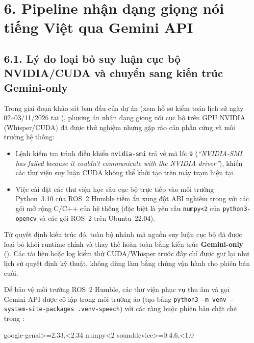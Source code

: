 \section*{6. Pipeline nhận dạng giọng nói tiếng Việt qua Gemini API}

\subsection*{6.1. Lý do loại bỏ suy luận cục bộ NVIDIA/CUDA và chuyển sang kiến trúc Gemini-only}

Trong giai đoạn khảo sát ban đầu của dự án (xem hồ sơ kiểm toán lịch sử ngày 02--03/11/2026 tại ), phương án nhận dạng giọng nói cục bộ trên GPU NVIDIA (Whisper/CUDA) đã được thử nghiệm nhưng gặp rào cản phần cứng và môi trường hệ thống:
\begin{itemize}[leftmargin=1.2cm]
  \item Lệnh kiểm tra trình điều khiển \texttt{nvidia-smi} trả về mã lỗi \texttt{9} (\textit{``NVIDIA-SMI has failed because it couldn't communicate with the NVIDIA driver''}), khiến các thư viện suy luận CUDA không thể khởi tạo trên máy trạm hiện tại.
  \item Việc cài đặt các thư viện học sâu cục bộ trực tiếp vào môi trường Python~3.10 của ROS~2 Humble tiềm ẩn xung đột ABI nghiêm trọng với các gói mở rộng C/C++ của hệ thống (đặc biệt là yêu cầu \texttt{numpy<2} của \texttt{python3-opencv} và các gói ROS~2 trên Ubuntu~22.04).
\end{itemize}

Từ quyết định kiến trúc đó, toàn bộ nhánh mã nguồn suy luận cục bộ đã được loại bỏ khỏi runtime chính và thay thế hoàn toàn bằng kiến trúc \textbf{Gemini-only} (). Các tài liệu hoặc log kiểm thử CUDA/Whisper trước đây chỉ được giữ lại như lịch sử quyết định kỹ thuật, không dùng làm bằng chứng vận hành cho phiên bản cuối.

Để bảo vệ môi trường ROS~2 Humble, các thư viện phục vụ thu âm và gọi Gemini API được cô lập trong môi trường ảo  (tạo bằng \texttt{python3 -m venv --system-site-packages .venv-speech}) với các ràng buộc phiên bản chặt chẽ trong :

\begin{svcode}
google-genai>=2.33,<2.34
numpy<2
sounddevice>=0.4.6,<1.0
\end{svcode}

